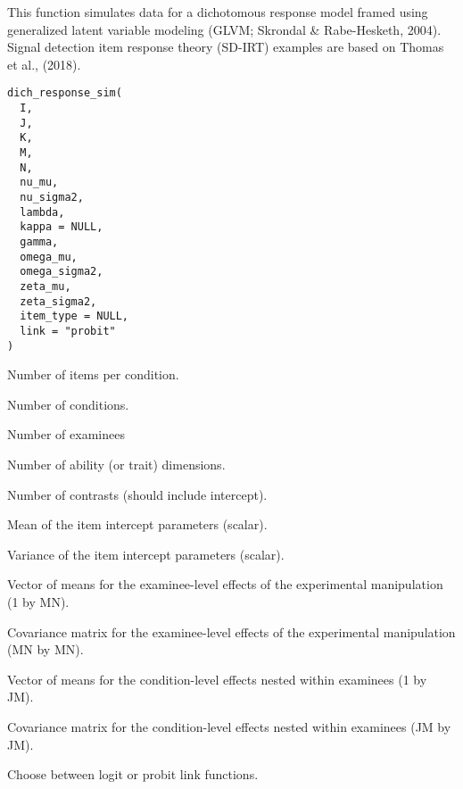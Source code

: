 \documentclass[a4paper]{book}
\begin{document}
%
\begin{Description}\relax
This function simulates data for a dichotomous response model framed using
generalized latent variable modeling (GLVM; Skrondal \& Rabe-Hesketh, 2004).
Signal detection item response theory (SD-IRT) examples are based on
Thomas et al., (2018).
\end{Description}
%
\begin{Usage}
\begin{verbatim}
dich_response_sim(
  I,
  J,
  K,
  M,
  N,
  nu_mu,
  nu_sigma2,
  lambda,
  kappa = NULL,
  gamma,
  omega_mu,
  omega_sigma2,
  zeta_mu,
  zeta_sigma2,
  item_type = NULL,
  link = "probit"
)
\end{verbatim}
\end{Usage}
%
\begin{Arguments}
\begin{ldescription}
\item[\code{I}] Number of items per condition.

\item[\code{J}] Number of conditions.

\item[\code{K}] Number of examinees

\item[\code{M}] Number of ability (or trait) dimensions.

\item[\code{N}] Number of contrasts (should include intercept).

\item[\code{nu\_mu}] Mean of the item intercept parameters (scalar).

\item[\code{nu\_sigma2}] Variance of the item intercept parameters (scalar).

\item[\code{omega\_mu}] Vector of means for the examinee-level effects of the
experimental manipulation (1 by MN).

\item[\code{omega\_sigma2}] Covariance matrix for the examinee-level effects of the
experimental manipulation (MN by MN).

\item[\code{zeta\_mu}] Vector of means for the condition-level effects nested within
examinees (1 by JM).

\item[\code{zeta\_sigma2}] Covariance matrix for the condition-level effects nested
within examinees (JM by JM).

\item[\code{link}] Choose between logit or probit link functions.
\end{ldescription}
\end{Arguments}
\end{document}

